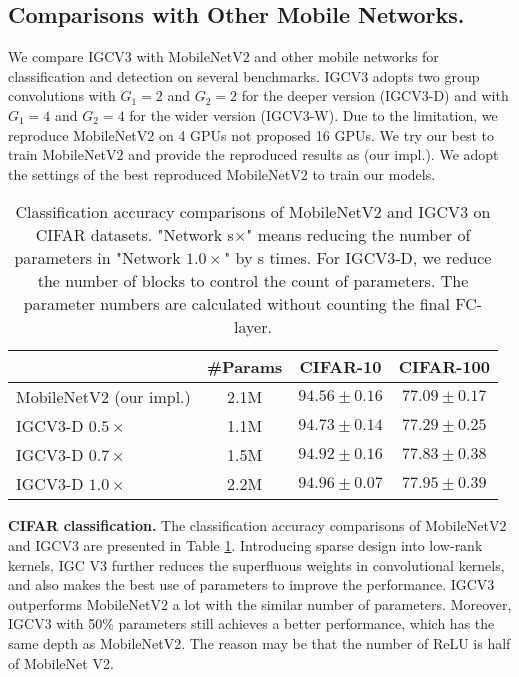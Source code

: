 \documentclass{bmvc2k}
\begin{document}
	\subsection{Comparisons with Other Mobile Networks.}
	We compare IGCV$3$ with MobileNetV$2$ and other mobile networks for classification and detection on several benchmarks. IGCV$3$ adopts two group convolutions with $G_1=2$ and $G_2=2$ for the deeper version (IGCV$3$-D) and with $G_1=4$ and $G_2=4$ for the wider version (IGCV$3$-W). Due to the limitation, we reproduce MobileNetV$2$ on 4 GPUs not proposed 16 GPUs. We try our best to train MobileNetV$2$ and provide the reproduced results as (our impl.). We adopt the settings of the best reproduced MobileNetV$2$ to train our models.
	\begin{table}[htb!]
		\centering
		\begin{tabular}{|l||c|c|c|}
			\hline
			& \#Params& CIFAR-10 & CIFAR-100\\
			\hline\hline
			MobileNetV$2$ (our impl.) & 2.1M & $94.56\pm{0.16}$ & $77.09\pm{0.17}$\\
			IGCV$3$-D $0.5\times$ & 1.1M & $94.73\pm0.14$  & $77.29\pm0.25$ \\
			IGCV$3$-D $0.7\times$ & 1.5M & $94.92\pm0.16$ & $77.83\pm0.38$ \\
			IGCV$3$-D $1.0\times$ & 2.2M & $\mathbf{94.96\pm{0.07}}$ &$\mathbf{77.95\pm0.39}$ \\
			\hline
		\end{tabular}
		\caption{Classification accuracy comparisons of MobileNetV$2$ and IGCV$3$ on CIFAR datasets. "Network s$\times$" means reducing the number of parameters in "Network $1.0\times$" by s times. For IGCV$3$-D, we reduce the number of blocks to control the count of parameters. The parameter numbers are calculated without counting the final FC-layer.}
		\label{tab:diff_mn_igcv3}
	\end{table}
	
	\noindent\textbf{CIFAR classification.} The classification accuracy comparisons of MobileNetV$2$ and IGCV$3$ are presented in Table \ref{tab:diff_mn_igcv3}. Introducing sparse design into low-rank kernels, IGC V3 further reduces the superfluous weights in convolutional kernels, and also makes the best use of parameters to improve the performance. IGCV$3$ outperforms MobileNetV$2$ a lot with the similar number of parameters. Moreover, IGCV$3$ with 50\% parameters still achieves a better performance, which has the same depth as MobileNetV2. The reason may be that the number of ReLU is half of MobileNet V2.
	
\end{document}

